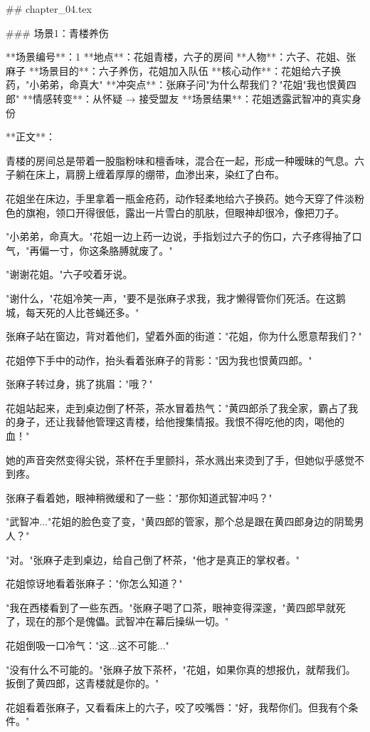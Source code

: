 ## chapter_04.tex

### 场景1：青楼养伤

**场景编号**：1  
**地点**：花姐青楼，六子的房间  
**人物**：六子、花姐、张麻子  
**场景目的**：六子养伤，花姐加入队伍  
**核心动作**：花姐给六子换药，"小弟弟，命真大"  
**冲突点**：张麻子问"为什么帮我们？"花姐"我也恨黄四郎"  
**情感转变**：从怀疑 → 接受盟友  
**场景结果**：花姐透露武智冲的真实身份

**正文**：

青楼的房间总是带着一股脂粉味和檀香味，混合在一起，形成一种暧昧的气息。六子躺在床上，肩膀上缠着厚厚的绷带，血渗出来，染红了白布。

花姐坐在床边，手里拿着一瓶金疮药，动作轻柔地给六子换药。她今天穿了件淡粉色的旗袍，领口开得很低，露出一片雪白的肌肤，但眼神却很冷，像把刀子。

"小弟弟，命真大。"花姐一边上药一边说，手指划过六子的伤口，六子疼得抽了口气，"再偏一寸，你这条胳膊就废了。"

"谢谢花姐。"六子咬着牙说。

"谢什么，"花姐冷笑一声，"要不是张麻子求我，我才懒得管你们死活。在这鹅城，每天死的人比苍蝇还多。"

张麻子站在窗边，背对着他们，望着外面的街道："花姐，你为什么愿意帮我们？"

花姐停下手中的动作，抬头看着张麻子的背影："因为我也恨黄四郎。"

张麻子转过身，挑了挑眉："哦？"

花姐站起来，走到桌边倒了杯茶，茶水冒着热气："黄四郎杀了我全家，霸占了我的身子，还让我替他管理这青楼，给他搜集情报。我恨不得吃他的肉，喝他的血！"

她的声音突然变得尖锐，茶杯在手里颤抖，茶水溅出来烫到了手，但她似乎感觉不到疼。

张麻子看着她，眼神稍微缓和了一些："那你知道武智冲吗？"

"武智冲..."花姐的脸色变了变，"黄四郎的管家，那个总是跟在黄四郎身边的阴鸷男人？"

"对。"张麻子走到桌边，给自己倒了杯茶，"他才是真正的掌权者。"

花姐惊讶地看着张麻子："你怎么知道？"

"我在西楼看到了一些东西。"张麻子喝了口茶，眼神变得深邃，"黄四郎早就死了，现在的那个是傀儡。武智冲在幕后操纵一切。"

花姐倒吸一口冷气："这...这不可能..."

"没有什么不可能的。"张麻子放下茶杯，"花姐，如果你真的想报仇，就帮我们。扳倒了黄四郎，这青楼就是你的。"

花姐看着张麻子，又看看床上的六子，咬了咬嘴唇："好，我帮你们。但我有个条件。"

